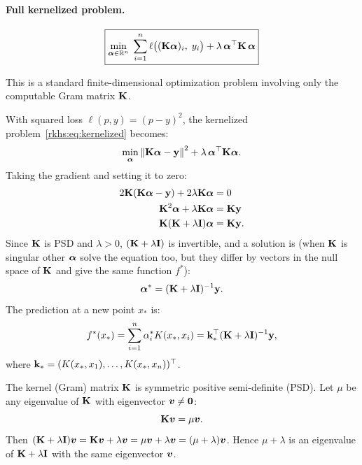 \begin{notechapter}
\paragraph{Full kernelized problem.}
\begin{equation}
\label{rkhs:eq:kernelized}
\boxed{\min_{\boldsymbol{\alpha} \in \mathbb{R}^n}\; \sum_{i=1}^n \ell\bigl((\mathbf{K}\boldsymbol{\alpha})_i,\; y_i\bigr) + \lambda\, \boldsymbol{\alpha}^\top \mathbf{K}\, \boldsymbol{\alpha}}
\end{equation}

This is a standard finite-dimensional optimization problem involving
only the computable Gram matrix $\mathbf{K}$.

\begin{example}
With squared loss $\ell(p, y) = (p - y)^2$, the kernelized
problem~\eqref{rkhs:eq:kernelized} becomes:
\[
\min_{\boldsymbol{\alpha}} \left\|\mathbf{K}\boldsymbol{\alpha} - \mathbf{y}\right\|^2 + \lambda\,
\boldsymbol{\alpha}^\top \mathbf{K} \boldsymbol{\alpha}.
\]
Taking the gradient and setting it to zero:
\begin{align*}
2\mathbf{K}(\mathbf{K}\boldsymbol{\alpha} - \mathbf{y}) + 2\lambda\mathbf{K}\boldsymbol{\alpha} &= 0 \\
\mathbf{K}^2\boldsymbol{\alpha} + \lambda\mathbf{K}\boldsymbol{\alpha} &= \mathbf{K}\mathbf{y} \\
\mathbf{K}(\mathbf{K} + \lambda \mathbf{I})\boldsymbol{\alpha} &= \mathbf{K}\mathbf{y}.
\end{align*}
Since $\mathbf{K}$ is PSD and $\lambda > 0$, $(\mathbf{K} +
\lambda\mathbf{I})$ is invertible, and a solution is (when $\mathbf{K}$ is singular other $\boldsymbol{\alpha}$ solve the equation too, but they differ by vectors in the null space of $\mathbf{K}$ and give the same function $f^*$):
\[
\boldsymbol{\alpha}^* = (\mathbf{K} + \lambda\mathbf{I})^{-1}\mathbf{y}.
\]
The prediction at a new point $x_*$ is:
\[
f^*(x_*) = \sum_{i=1}^n \alpha_i^* K(x_*, x_i) = \mathbf{k}_*^\top (\mathbf{K}
+ \lambda\mathbf{I})^{-1}\mathbf{y},
\]
where $\mathbf{k}_* = (K(x_*, x_1), \ldots, K(x_*, x_n))^\top$.
\end{example}

\begin{intuition}
The kernel (Gram) matrix $\mathbf{K}$ is symmetric positive semi-definite (PSD).
Let $\mu$ be any eigenvalue of $\mathbf{K}$ with eigenvector $\boldsymbol{v} \neq \boldsymbol{0}$:
\[
\mathbf{K}\boldsymbol{v} = \mu \boldsymbol{v}.
\]
Then $(\mathbf{K} + \lambda\mathbf{I})\boldsymbol{v} = \mathbf{K}\boldsymbol{v} + \lambda\boldsymbol{v}
= \mu\boldsymbol{v} + \lambda\boldsymbol{v} = (\mu + \lambda)\boldsymbol{v}$.
Hence $\mu + \lambda$ is an eigenvalue of $\mathbf{K} + \lambda\mathbf{I}$
with the same eigenvector $\boldsymbol{v}$.


\end{intuition}
\end{notechapter}
